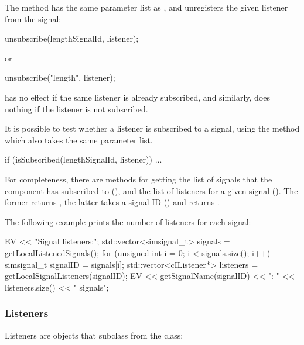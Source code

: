 \begin{note}
\begin{note}
The  method has the same parameter list
as , and unregisters the given listener
from the signal:

\begin{cpp}
unsubscribe(lengthSignalId, listener);
\end{cpp}

or

\begin{cpp}
unsubscribe("length", listener);
\end{cpp}

 has no effect if the same listener is already
subscribed, and similarly,  does nothing
if the listener is not subscribed.

It is possible to test whether a listener is subscribed to a signal,
using the  method which also takes the same
parameter list.

\begin{cpp}
if (isSubscribed(lengthSignalId, listener))
{
    ...
}
\end{cpp}

For completeness, there are methods for getting the list of signals
that the component has subscribed to (),
and the list of listeners for a given signal ().
The former returns , the latter takes
a signal ID () and returns .

The following example prints the number of listeners for each signal:

\begin{cpp}
EV << "Signal listeners:\n";
std::vector<simsignal_t> signals = getLocalListenedSignals();
for (unsigned int i = 0; i < signals.size(); i++) {
    simsignal_t signalID = signals[i];
    std::vector<cIListener*> listeners = getLocalSignalListeners(signalID);
    EV << getSignalName(signalID) << ": " << listeners.size() << " signals\n";
}
\end{cpp}

\subsubsection{Listeners}

Listeners are objects that subclass from the  class:


\end{note}
\end{note}
